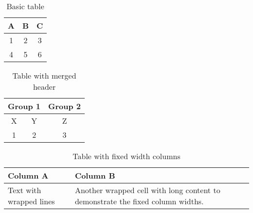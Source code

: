 \begin{table}[htbp]
  \centering
  \begin{tabular}{|c|c|c|}
    \hline
    A & B & C \\
    \hline
    1 & 2 & 3 \\
    4 & 5 & 6 \\
    \hline
  \end{tabular}
  \caption{Basic table}
  \label{tab:basic}
\end{table}

\begin{table}[htbp]
  \centering
  \begin{tabular}{|c|c|c|}
    \hline
    \multicolumn{2}{|c|}{Group 1} & Group 2 \\
    \hline
    X & Y & Z \\
    \hline
    1 & 2 & 3 \\
    \hline
  \end{tabular}
  \caption{Table with merged header}
  \label{tab:mergeheader}
\end{table}

\begin{table}[htbp]
  \centering
  \begin{tabular}{|>{\raggedright\arraybackslash}p{3cm}|p{5cm}|}
    \hline
    Column A & Column B \\
    \hline
    Text with wrapped lines & Another wrapped cell with long content to demonstrate the fixed column widths. \\
    \hline
  \end{tabular}
  \caption{Table with fixed width columns}
  \label{tab:fixedwidth}
\end{table}


